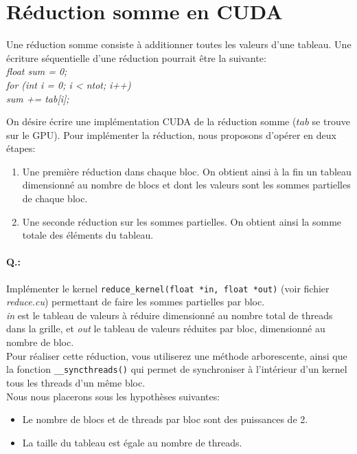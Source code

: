 \documentclass[a4paper,11pt]{article}
\newcounter{numexos}%
\newcommand{\exercice}[1]%
{%
  \addtocounter{numexos}{1}%
  \paragraph{Q.\thenumexos:}%
	{#1} %
}
\begin{document}
\section{R\'eduction somme en CUDA}
Une r\'eduction somme consiste \`a additionner toutes les valeurs d'une tableau. Une \'ecriture s\'equentielle d'une
r\'eduction pourrait \^etre la suivante:\\
\textit{
float sum = 0; \\
for (int i = 0; i < ntot; i++) \\
\hspace*{1cm} sum += tab[i]; \\
}
\newline

On d\'esire \'ecrire une impl\'ementation CUDA de la r\'eduction somme ($tab$ se trouve sur le GPU).
Pour impl\'ementer la r\'eduction, nous proposons d'op\'erer en deux \'etapes:
\begin{enumerate}
	\item Une premi\`ere r\'eduction dans chaque bloc. On obtient ainsi \`a la fin un tableau dimensionn\'e au nombre de
blocs et dont les valeurs sont les sommes partielles de chaque bloc.
	\item Une seconde r\'eduction sur les sommes partielles. On obtient ainsi la somme totale des \'el\'ements du tableau. 
\end{enumerate}

\exercice{Impl\'ementer le kernel \texttt{reduce\_kernel(float *in, float *out)} (voir fichier
\textit{reduce.cu}) permettant de faire les sommes partielles par bloc. \\
\textit{in} est le tableau de valeurs \`a r\'eduire dimensionn\'e au nombre total de threads dans
la grille, et \textit{out} le tableau de valeurs r\'eduites par bloc, dimensionn\'e au nombre de bloc. \\
Pour r\'ealiser cette r\'eduction,
vous utiliserez une m\'ethode arborescente, ainsi que la fonction \texttt{\_\_syncthreads()} qui permet de synchroniser
\`a l'int\'erieur d'un kernel tous les threads d'un m\^eme bloc. \\
Nous nous placerons sous les hypoth\`eses suivantes: 
\begin{itemize}
	\item Le nombre de blocs et de threads par bloc sont des puissances de 2.
	\item La taille du tableau est \'egale au nombre de threads.
\end{itemize}
}
\end{document}
